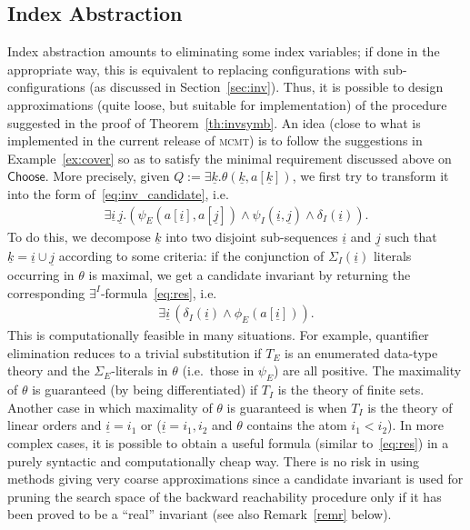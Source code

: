 \documentclass{LMCS}
\newcommand{\ui}{\ensuremath{\underline i}}
\newcommand{\uj}{\ensuremath{\underline j}}
\newcommand{\uk}{\ensuremath{\underline k}}
\theoremstyle{plain}\newtheorem{assumption}[thm]{Assumption}
\theoremstyle{plain}\newtheorem{proposition}[thm]{Proposition}
\theoremstyle{plain}\newtheorem{property}[thm]{Property}
\theoremstyle{plain}\newtheorem{example}[thm]{Example}
\theoremstyle{plain}\newtheorem{claim}[thm]{Claim}
\theoremstyle{plain}\newtheorem{lemma}[thm]{Lemma}
\begin{document}
\subsection{Index  Abstraction}
\label{sec:back+inv-heu}
Index abstraction amounts to eliminating some index variables; if done
in the appropriate way, this is equivalent to replacing configurations
with sub-con\-fi\-gu\-ra\-tions (as discussed in
Section~\ref{sec:inv}).  Thus, it is possible to design approximations
(quite loose, but suitable for implementation) of the procedure
suggested in the proof of Theorem~\ref{th:invsymb}.  An idea (close to
what is implemented in the current release of \textsc{mcmt}) is to
follow the suggestions in Example~\ref{ex:cover} so as to satisfy the
minimal requirement discussed above on $\mathsf{Choose}$.
More precisely, given $Q:=\exists \uk.\theta(\uk,a[\uk])$, we first
try to transform it into the form of~\eqref{eq:inv_candidate}, i.e.
\begin{eqnarray*}
  \exists \ui\,\uj.(\psi_E(a[\ui], a[\uj])  \wedge
                    \psi_I(\ui, \uj)        \wedge
                    \delta_I(\ui) ).
\end{eqnarray*}
To do this, we decompose $\uk$ into two disjoint sub-sequences $\ui$
and $\uj$ such that $\uk=\ui\cup \uj$ according to some criteria: if
the conjunction of $\Sigma_I(\ui)$ literals occurring in $\theta$ is
maximal, we get a candidate invariant by returning the corresponding
$\exists^I$-formula~\eqref{eq:res}, i.e.
\begin{eqnarray*}
  \exists \ui \,(\delta_I(\ui)\wedge \phi_E(a[\ui])) .
\end{eqnarray*}
This is computationally feasible in many situations.  For example,
quantifier elimination reduces to a trivial substitution if $T_E$ is
an enumerated data-type theory and the $\Sigma_E$-literals in $\theta$
(i.e.\ those in $\psi_E$) are all positive.  The maximality of
$\theta$ is guaranteed (by being differentiated) if $T_I$ is the
theory of finite sets.  Another case in which maximality of $\theta$
is guaranteed is when
$T_I$ is the theory of linear orders and $\ui=i_1$ or
($\ui=i_1, i_2$ and $\theta$ contains the atom $i_1 < i_2$). In more
complex cases, it is possible to obtain
a useful formula (similar to~\eqref{eq:res}) in a purely syntactic and
computationally cheap way.  There is no risk in using methods giving
very coarse approximations since
a candidate invariant is used for pruning the search space of the
backward reachability procedure only if it has been proved to be a
``real'' invariant (see also Remark~\ref{remr} below).
\end{document}
